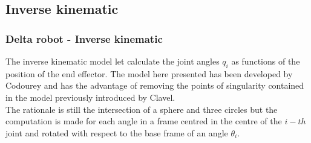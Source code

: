 \subsection{Inverse kinematic}
\begin{frame}
\frametitle{Delta robot - Inverse kinematic}
The inverse kinematic model let calculate the joint angles $q_i$ as functions of the position of the end effector.
The model here presented has been developed by Codourey  and has the advantage of removing the points of singularity contained in the model previously introduced by Clavel.\\
The rationale is still the intersection of a sphere and three circles but the computation is made for each angle in a frame centred in the centre of the $i-th$ joint and rotated with respect to the base frame of an angle $\theta_i$.
\end{frame}
%
%
